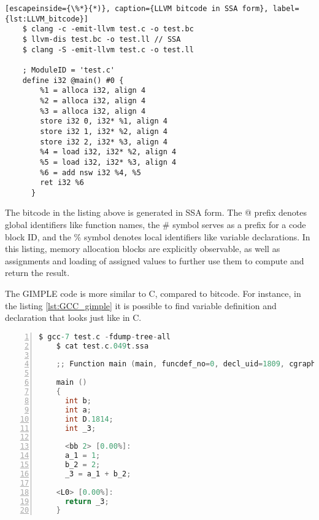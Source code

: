 \begin{lstlisting}[escapeinside={\%*}{*)}, caption={LLVM bitcode in SSA form}, label={lst:LLVM_bitcode}]
    $ clang -c -emit-llvm test.c -o test.bc
    $ llvm-dis test.bc -o test.ll // SSA
    $ clang -S -emit-llvm test.c -o test.ll

    ; ModuleID = 'test.c'
    define i32 @main() #0 {
        %1 = alloca i32, align 4
        %2 = alloca i32, align 4
        %3 = alloca i32, align 4
        store i32 0, i32* %1, align 4
        store i32 1, i32* %2, align 4
        store i32 2, i32* %3, align 4
        %4 = load i32, i32* %2, align 4
        %5 = load i32, i32* %3, align 4
        %6 = add nsw i32 %4, %5
        ret i32 %6
      }
\end{lstlisting}

The bitcode in the listing above is generated in SSA form. The @ prefix denotes global identifiers like function names, the \# symbol serves as a prefix for a code block ID, and the \% symbol denotes local identifiers like variable declarations. In this listing, memory allocation blocks are explicitly observable, as well as assignments and loading of assigned values to further use them to compute and return the result.

The GIMPLE code is more similar to C, compared to bitcode. For instance, in the listing \ref{lst:GCC_gimple} it is possible to find variable definition and declaration that looks just like in C.

\begin{lstlisting}[frame=L, language=C, numbers=left,basicstyle=\footnotesize, caption={GCC gimple in SSA form}, label={lst:GCC_gimple}]
    $ gcc-7 test.c -fdump-tree-all
    $ cat test.c.049t.ssa

    ;; Function main (main, funcdef_no=0, decl_uid=1809, cgraph_uid=0, symbol_order=0)
    
    main ()
    {
      int b;
      int a;
      int D.1814;
      int _3;
    
      <bb 2> [0.00%]:
      a_1 = 1;
      b_2 = 2;
      _3 = a_1 + b_2;
    
    <L0> [0.00%]:
      return _3;
    }
\end{lstlisting}


